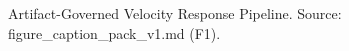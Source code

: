 ﻿%
\nonfinalnote


\begin{figure}[htbp]
\centering
{}
\caption{Artifact-Governed Velocity Response Pipeline. Source: figure\_caption\_pack\_v1.md (F1).}
\label{fig:method_pipeline}
\end{figure}


